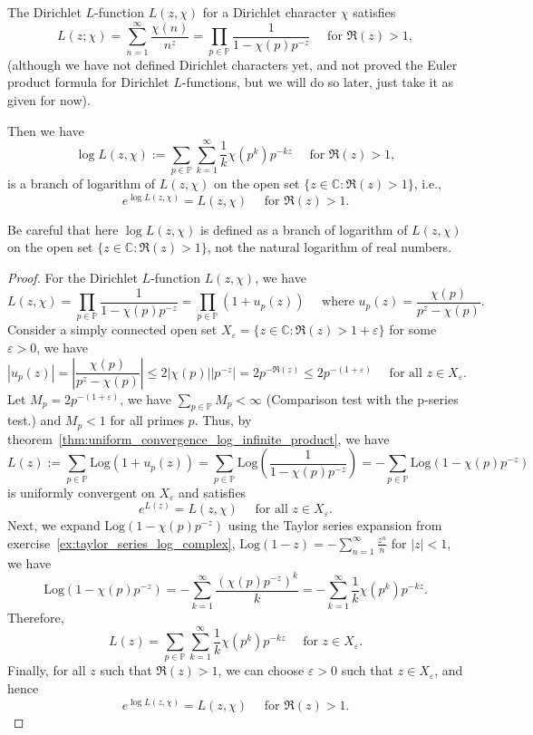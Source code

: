 \documentclass{elegantbook}
\begin{document}
\begin{corollary} \label{cor:log_dirichlet_L_function}
  The Dirichlet $L$-function $L(z, \chi)$ for a Dirichlet character $\chi$ satisfies
  \[
    L(z;\chi)=\sum_{n=1}^{\infty} \frac{\chi(n)}{n^z}=\prod_{p\in\mathbb{P}} \frac{1}{1 - \chi(p)p^{-z}} \quad \text{ for } \Re(z)>1,
  \]
  (although we have not defined Dirichlet characters yet, and not proved the Euler product formula for Dirichlet $L$-functions, but we will do so later, just take it as given for now).

  Then we have
  \[
    \log L(z, \chi) := \sum_{p\in\mathbb{P}}\sum_{k=1}^{\infty}\frac{1}{k}\chi(p^k)p^{-kz} \quad \text{ for } \Re(z)>1,
  \]
  is a branch of logarithm of $L(z, \chi)$ on the open set $\{ z \in \mathbb{C} : \Re(z) > 1 \}$, i.e.,
  \[
    e^{\log L(z, \chi)} = L(z, \chi) \quad \text{ for } \Re(z)>1.
  \]
\end{corollary}

\begin{note}
  Be careful that here $\log L(z, \chi)$ is defined as a branch of logarithm of $L(z, \chi)$ on the open set $\{ z \in \mathbb{C} : \Re(z) > 1 \}$, not the natural logarithm of real numbers.
\end{note}

\begin{proof}
  For the Dirichlet $L$-function $L(z, \chi)$, we have
  \[
    L(z, \chi) = \prod_{p\in\mathbb{P}} \frac{1}{1 - \chi(p)p^{-z}} = \prod_{p\in\mathbb{P}} (1 + u_p(z)) \quad \text{ where } u_p(z) = \frac{\chi(p)}{p^{z} - \chi(p)}.
  \]
  Consider a simply connected open set $X_{\varepsilon} = \{ z \in \mathbb{C} : \Re(z) > 1 + \varepsilon \}$ for some $\varepsilon > 0$, we have
  \[
    |u_p(z)| = \left| \frac{\chi(p)}{p^{z} - \chi(p)} \right| \leq 2 |\chi(p)| |p^{-z}| = 2 p^{-\Re(z)} \leq 2 p^{-(1 + \varepsilon)} \quad \text{ for all } z \in X_{\varepsilon}.
  \]
  Let $M_p = 2p^{-(1 + \varepsilon)}$, we have $\sum_{p\in\mathbb{P}} M_p < \infty$ (Comparison test with the p-series test.) and $M_p < 1$ for all primes $p$.
  Thus, by theorem~\ref{thm:uniform_convergence_log_infinite_product}, we have
  \[
    L(z) := \sum_{p\in\mathbb{P}} \mathrm{Log}(1 + u_p(z))= \sum_{p\in\mathbb{P}} \mathrm{Log}\left(\frac{1}{1 - \chi(p)p^{-z}}\right)= -\sum_{p\in\mathbb{P}} \mathrm{Log}(1 - \chi(p)p^{-z})
  \]
  is uniformly convergent on $X_{\varepsilon}$ and satisfies
  \[
    e^{L(z)} = L(z, \chi) \quad \text{ for all } z \in X_{\varepsilon}.
  \]
  Next, we expand $\mathrm{Log}(1 - \chi(p)p^{-z})$ using the Taylor series expansion from exercise~\ref{ex:taylor_series_log_complex}, $\mathrm{Log}(1-z) = -\sum_{n=1}^{\infty} \frac{z^n}{n}$ for $|z|<1$, we have
  \[
    \mathrm{Log}(1 - \chi(p)p^{-z}) = -\sum_{k=1}^{\infty} \frac{(\chi(p)p^{-z})^k}{k} = -\sum_{k=1}^{\infty} \frac{1}{k} \chi(p^k) p^{-kz}.
  \]
  Therefore,
  \[
    L(z) = \sum_{p\in\mathbb{P}} \sum_{k=1}^{\infty} \frac{1}{k} \chi(p^k) p^{-kz} \quad \text{ for } z \in X_{\varepsilon}.
  \]
  Finally, for all $z$ such that $\Re(z) > 1$, we can choose $\varepsilon > 0$ such that $z \in X_{\varepsilon}$, and hence
  \[
    e^{\log L(z, \chi)} = L(z, \chi) \quad \text{ for } \Re(z) > 1.
  \]
\end{proof}
\end{document}
